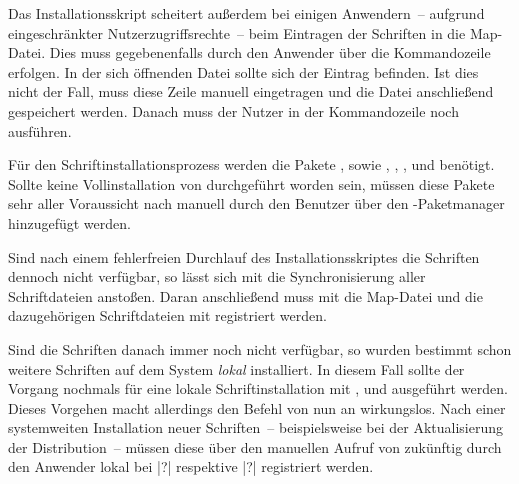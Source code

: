 Das Installationsskript scheitert außerdem bei einigen Anwendern~-- aufgrund 
eingeschränkter Nutzerzugriffsrechte~-- beim Eintragen der Schriften in die 
Map-Datei. Dies muss gegebenenfalls durch den Anwender über die Kommandozeile 
 erfolgen. In der sich öffnenden 
Datei sollte sich der Eintrag  befinden. Ist dies nicht 
der Fall, muss diese Zeile manuell eingetragen und die Datei anschließend 
gespeichert werden. Danach muss der Nutzer in der Kommandozeile noch 
 ausführen.


Für den Schriftinstallationsprozess werden die Pakete , 
 sowie , , 
,  und  benötigt. Sollte 
keine Vollinstallation von  durchgeführt worden 
sein, müssen diese Pakete sehr aller Voraussicht nach manuell durch den 
Benutzer über den -Paketmanager hinzugefügt 
werden.

Sind nach einem fehlerfreien Durchlauf des Installationsskriptes die Schriften 
dennoch nicht verfügbar, so lässt sich mit  
die Synchronisierung aller Schriftdateien anstoßen. Daran anschließend muss mit 
 die Map-Datei und die dazugehörigen 
Schriftdateien mit  registriert werden.

Sind die Schriften danach immer noch nicht verfügbar, so wurden bestimmt schon 
weitere Schriften auf dem System \emph{lokal} installiert. In diesem Fall 
sollte der Vorgang nochmals für eine lokale Schriftinstallation mit 
,  und 
 ausgeführt werden. Dieses Vorgehen macht allerdings den 
Befehl  von nun an wirkungslos. Nach einer systemweiten 
Installation neuer Schriften~-- beispielsweise bei der Aktualisierung der 
Distribution~-- müssen diese über den manuellen Aufruf von  
zukünftig durch den Anwender lokal bei |?| 
respektive |?| registriert werden.



